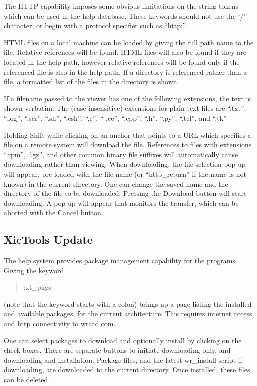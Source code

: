 The HTTP capability imposes some obvious limitations on the string
tokens which can be used in the help database.  These keywords should
not use the `/' character, or begin with a protocol specifier such as
``{\vt http:}''.

HTML files on a local machine can be loaded by giving the full path
name to the file.  Relative references will be found.  HTML files will
also be found if they are located in the help path, however relative
references will be found only if the referenced file is also in the
help path.  If a directory is referenced rather than a file, a
formatted list of the files in the directory is shown.

If a filename passed to the viewer has one of the following
extensions, the text is shown verbatim.  The (case insensitive)
extensions for plain-text files are ``{\vt .txt}'', ``{\vt .log}'',
``{\vt .scr}'', ``{\vt .sh}'', ``{\vt .csh}'', ``{\vt .c}'', ``{\vt
.cc}'', ``{\vt .cpp}'', ``{\vt .h}'', ``{\vt .py}'', ``{\vt .tcl}'',
and ``{\vt .tk}''

Holding {\kb Shift} while clicking on an anchor that points to a URL
which specifies a file on a remote system will download the file. 
References to files with extensions ``{\vt .rpm}'', ``{\vt .gz}'', and
other common binary file suffixes will automatically cause downloading
rather than viewing.  When downloading, the file selection pop-up will
appear, pre-loaded with the file name (or ``{\vt http\_return}'' if
the name is not known) in the current directory.  One can change the
saved name and the directory of the file to be downloaded.  Pressing
the {\cb Download} button will start downloading.  A pop-up will
appear that monitors the transfer, which can be aborted with the {\cb
Cancel} button.

\subsection{XicTools Update}
\label{update}
The help system provides package management capability for the
{\XicTools} programs.  Giving the keyword
\begin{quote}\vt
:xt\_pkgs
\end{quote}
(note that the keyword starts with a colon) brings up a page listing
the installed and available {\XicTools} packages, for the current
architecture.  This requires internet access and http connectivity to
{\vt wrcad.com}.

One can select packages to download and optionally install by clicking
on the check boxes.  There are separate buttons to initiate
downloading only, and downloading and installation.  Package files,
and the latest {\vt wr\_install} script if downloading, are downloaded
to the current directory.  Once installed, these files can be deleted.

